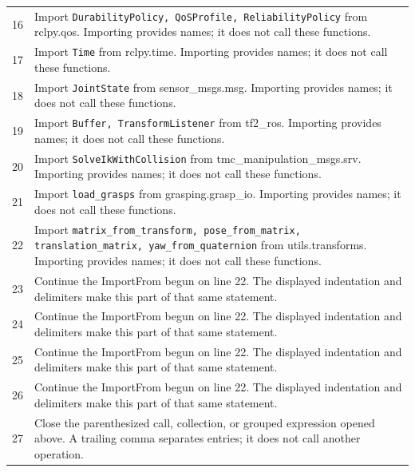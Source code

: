 \documentclass[11pt,a4paper]{book}
\begin{document}
\begin{longtable}{r p{}}
16 & Import \texttt{DurabilityPolicy, QoSProfile, ReliabilityPolicy} from rclpy.qos. Importing provides names; it does not call these functions. \\

17 & Import \texttt{Time} from rclpy.time. Importing provides names; it does not call these functions. \\

18 & Import \texttt{JointState} from sensor\_msgs.msg. Importing provides names; it does not call these functions. \\

19 & Import \texttt{Buffer, TransformListener} from tf2\_ros. Importing provides names; it does not call these functions. \\

20 & Import \texttt{SolveIkWithCollision} from tmc\_manipulation\_msgs.srv. Importing provides names; it does not call these functions. \\

21 & Import \texttt{load\_grasps} from grasping.grasp\_io. Importing provides names; it does not call these functions. \\

22 & Import \texttt{matrix\_from\_transform, pose\_from\_matrix, translation\_matrix, yaw\_from\_quaternion} from utils.transforms. Importing provides names; it does not call these functions. \\

23 & Continue the ImportFrom begun on line 22. The displayed indentation and delimiters make this part of that same statement. \\

24 & Continue the ImportFrom begun on line 22. The displayed indentation and delimiters make this part of that same statement. \\

25 & Continue the ImportFrom begun on line 22. The displayed indentation and delimiters make this part of that same statement. \\

26 & Continue the ImportFrom begun on line 22. The displayed indentation and delimiters make this part of that same statement. \\

27 & Close the parenthesized call, collection, or grouped expression opened above. A trailing comma separates entries; it does not call another operation. \\


\end{longtable}
\end{document}
